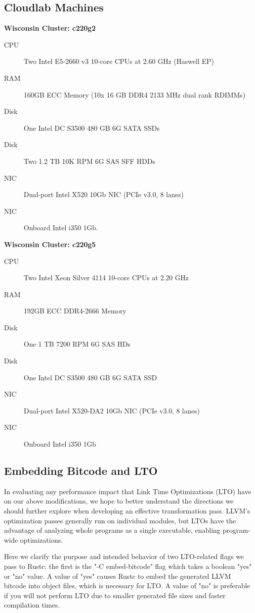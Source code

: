\documentclass{article}
\begin{document}
\subsection{Cloudlab Machines}
\bigskip

\textbf{Wisconsin Cluster: c220g2}

\begin{description}
\item[CPU] Two Intel E5-2660 v3 10-core CPUs at 2.60 GHz (Haswell EP)
\item[RAM] 160GB ECC Memory (10x 16 GB DDR4 2133 MHz dual rank RDIMMs)
\item[Disk] One Intel DC S3500 480 GB 6G SATA SSDs
\item[Disk] Two 1.2 TB 10K RPM 6G SAS SFF HDDs
\item[NIC] Dual-port Intel X520 10Gb NIC (PCIe v3.0, 8 lanes)
\item[NIC] Onboard Intel i350 1Gb.
\end{description}
\bigskip

\noindent\textbf{Wisconsin Cluster: c220g5}

\begin{description}
\item[CPU] Two Intel Xeon Silver 4114 10-core CPUs at 2.20 GHz
\item[RAM] 192GB ECC DDR4-2666 Memory
\item[Disk] One 1 TB 7200 RPM 6G SAS HDs
\item[Disk] One Intel DC S3500 480 GB 6G SATA SSD
\item[NIC] Dual-port Intel X520-DA2 10Gb NIC (PCIe v3.0, 8 lanes)
\item[NIC] Onboard Intel i350 1Gb
\end{description}

\subsection{Embedding Bitcode and LTO}

In evaluating any performance impact that Link Time Optimizations (LTO) have on our above modifications, we hope to better understand the directions we should further explore when developing an effective transformation pass. 
%
LLVM's optimization passes generally run on individual modules, but LTOs have the advantage of analyzing whole programs as a single executable, enabling program-wide optimizations. 
%

Here we clarify the purpose and intended behavior of two LTO-related flags we pass to Rustc: the first is the "-C embed-bitcode" flag which takes a boolean "yes" or "no" value. 
%
A value of "yes" causes Rustc to embed the generated LLVM bitcode into object files, which is necessary for LTO.
%
A value of "no" is preferable if you will not perform LTO due to smaller generated file sizes and faster compilation times. 
\end{document}
